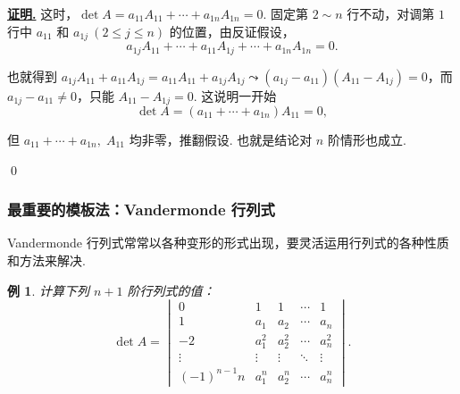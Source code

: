 \documentclass[10pt,openany]{article}
\theoremstyle{thmstyle} %
\theoremstyle{defstyle} %
\theoremstyle{prostyle} %
\theoremstyle{exastyle}
\newtheorem{example}[theorem]{例}
\theoremstyle{remstyle}
\renewenvironment{proof}[1][证明]{\par\underline{\textbf{#1.}} \;\fangsong}{\qed\par}
\begin{document}
\begin{proof}
	这时，\( \det A=a_{11}A_{11}+\cdots+a_{1n}A_{1n}=0 \). 固定第 \( 2 \sim n \) 行不动，对调第 \( 1 \) 行中 \( a_{11} \) 和 \( a_{1j} \ (2 \leq j \leq n) \) 的位置，由反证假设，
	\[ a_{1j}A_{11}+\cdots+a_{11}A_{1j}+\cdots+a_{1n}A_{1n}=0. \]
	
	也就得到 \( a_{1j}A_{11}+a_{11}A_{1j}=a_{11}A_{11}+a_{1j}A_{1j} \leadsto (a_{1j}-a_{11})(A_{11}-A_{1j})=0 \)，而 \( a_{1j}-a_{11} \neq 0 \)，只能 \( A_{11}-A_{1j}=0 \). 这说明一开始
	\[ \det A=(a_{11}+\cdots+a_{1n})A_{11}=0, \]
	
	但 \( a_{11}+\cdots+a_{1n}, \; A_{11} \) 均非零，推翻假设. 也就是结论对 \( n \) 阶情形也成立.
	
	
\end{proof}

\subsubsection{最重要的模板法：Vandermonde 行列式}

Vandermonde 行列式常常以各种变形的形式出现，要灵活运用行列式的各种性质和方法来解决.

\begin{example}
	计算下列 \( n+1 \) 阶行列式的值：
	\[ \det A= 	\begin{vmatrix}
		0 & 1 & 1 & \cdots & 1 \\
		1 & a_1 & a_2 & \cdots & a_n \\
		-2 & a_1^{2} & a_2^{2} & \cdots & a_n^{2} \\
		\vdots & \vdots & \vdots & \ddots & \vdots \\
		(-1)^{n-1} n & a_1^{n} & a_2^{n} & \cdots & a_n^{n}
	\end{vmatrix}.\]
\end{example}
\end{document}
